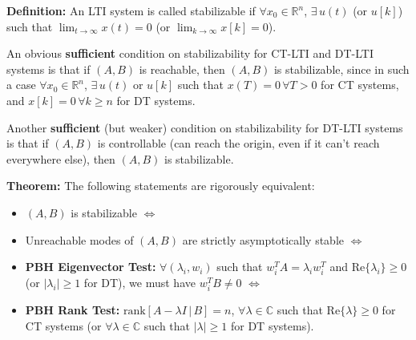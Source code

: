 \documentclass[twoside, 11pt, a4paper]{article}
\begin{document}
 \textbf{Definition:} An LTI system is called stabilizable if 
 $\forall x_0 \in \mathbb{R}^{n}$, $\exists \, u(t)$ (or $u[k]$) such that
 $\lim_{t\to\infty} x(t) = 0$ (or $\lim_{k\to\infty} x[k] = 0$).

 An obvious \textbf{sufficient} condition on stabilizability for CT-LTI and DT-LTI systems is that if $(A,B)$ is reachable, then $(A,B)$ is stabilizable, since
 in such a case $\forall x_0 \in \mathbb{R}^{n}$, $\exists \, u(t)$ or $u[k]$
 such that $x(T) = 0 \, \forall T > 0$ for CT systems, and $x[k] = 0 \, \forall  k \geq n$ for DT systems. 

Another \textbf{sufficient} (but weaker) condition on stabilizability for DT-LTI systems is that if $(A,B)$ is controllable (can reach the origin, even if it can't reach everywhere else), then $(A,B)$ is stabilizable. 

\textbf{Theorem:} The following statements are rigorously equivalent:
\begin{itemize}
\item $(A,B)$ is stabilizable $\iff$
\item Unreachable modes of $(A,B)$ are strictly asymptotically stable $\iff$
\item \textbf{PBH Eigenvector Test:} $\forall (\lambda_i , w_i)$ such that $w_i^T A = \lambda_i w_i^T$
and $\mathrm{Re}\lbrace \lambda_i \rbrace \geq 0$ (or $|\lambda_i| \geq 1$ for DT), we must have $w_i^T B \neq 0$ $\iff$
\item \textbf{PBH Rank Test:} $\mathrm{rank}\left[ A - \lambda I \, | \, B \right] = n$,
$\forall \lambda \in \mathbb{C}$ such that $\mathrm{Re}\lbrace \lambda \rbrace \geq 0$ for CT systems (or $\forall \lambda \in \mathbb{C}$ such that $|\lambda|  \geq 1$ for DT systems).
\end{itemize}
\end{document}
